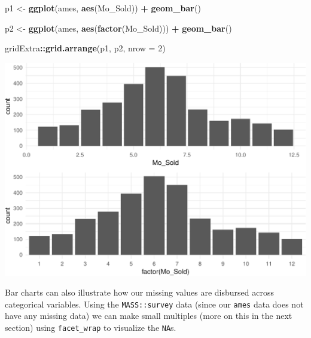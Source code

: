 \documentclass[]{article}
\newenvironment{Shaded}{\begin{snugshade}}{\end{snugshade}}
\newcommand{\KeywordTok}[1]{\textcolor[rgb]{0.13,0.29,0.53}{\textbf{#1}}}
\newcommand{\DataTypeTok}[1]{\textcolor[rgb]{0.13,0.29,0.53}{#1}}
\newcommand{\DecValTok}[1]{\textcolor[rgb]{0.00,0.00,0.81}{#1}}
\newcommand{\StringTok}[1]{\textcolor[rgb]{0.31,0.60,0.02}{#1}}
\newcommand{\OperatorTok}[1]{\textcolor[rgb]{0.81,0.36,0.00}{\textbf{#1}}}
\newcommand{\NormalTok}[1]{#1}
\begin{document}
\begin{Shaded}
\begin{Highlighting}[]
\NormalTok{p1 <-}\StringTok{ }\KeywordTok{ggplot}\NormalTok{(ames, }\KeywordTok{aes}\NormalTok{(Mo_Sold)) }\OperatorTok{+}\StringTok{ }
\StringTok{  }\KeywordTok{geom_bar}\NormalTok{()}

\NormalTok{p2 <-}\StringTok{ }\KeywordTok{ggplot}\NormalTok{(ames, }\KeywordTok{aes}\NormalTok{(}\KeywordTok{factor}\NormalTok{(Mo_Sold))) }\OperatorTok{+}\StringTok{ }
\StringTok{  }\KeywordTok{geom_bar}\NormalTok{()}

\NormalTok{gridExtra}\OperatorTok{::}\KeywordTok{grid.arrange}\NormalTok{(p1, p2, }\DataTypeTok{nrow =} \DecValTok{2}\NormalTok{)}
\end{Highlighting}
\end{Shaded}

\begin{center}\includegraphics{Chapter_3_-_Visualization_files/figure-latex/int1-1} \end{center}

Bar charts can also illustrate how our missing values are disbursed
across categorical variables. Using the \texttt{MASS::survey} data
(since our \texttt{ames} data does not have any missing data) we can
make small multiples (more on this in the next section) using
\texttt{facet\_wrap} to visualize the \texttt{NA}s.

\begin{Shaded}
\end{Shaded}
\end{document}
